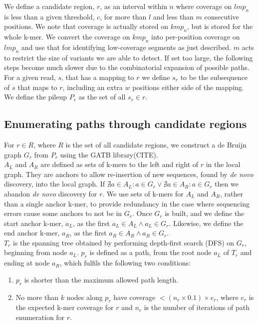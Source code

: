 We define a candidate region, $r$, as an interval within $n$ where coverage on $lmp_n$ is less than a given threshold, $c$, for more than $l$ and less than $m$ consecutive positions. We note that coverage is actually stored on $kmp_n$, but is stored for the whole k-mer. We convert the coverage on $kmp_n$ into per-position coverage on $lmp_n$ and use that for identifying low-coverage segments as just described. $m$ acts to restrict the size of variants we are able to detect. If set too large, the following steps become much slower due to the combinatorial expansion of possible paths. \\
For a given read, $s$, that has a mapping to $r$ we define $s_r$ to be the subsequence of $s$ that maps to $r$, including an extra $w$ positions either side of the mapping. We define the pileup $P_r$ as the set of all $s_r \in r$.

\subsection{Enumerating paths through candidate regions}

For $r \in R$, where $R$ is the set of all candidate regions, we construct a de Bruijn graph $G_r$ from $P_r$ using the GATB library(CITE). \\
$A_L$ and $A_R$ are defined as sets of k-mers to the left and right of $r$ in the local graph. They are anchors to allow re-insertion of new sequences, found by \textit{de novo} discovery, into the local graph. If  $\nexists a \in A_L : a \in G_r \lor \nexists a \in A_R : a \in G_r$ then we abandon \textit{de novo} discovery for $r$. We use sets of k-mers for $A_L$ and $A_R$, rather than a single anchor k-mer, to provide redundancy in the case where sequencing errors cause some anchors to not be in $G_r$. Once $G_r$ is built, and we define the start anchor k-mer, $a_L$, as the first $a_L \in A_L \land a_L \in G_r$. Likewise, we define the end anchor k-mer, $a_R$, as the first $a_R \in A_R \land a_R \in G_r$.\\

$T_r$ is the spanning tree obtained by performing depth-first search (DFS) on $G_r$, beginning from node $a_L$. $p_r$ is defined as a path, from the root node $a_L$ of $T_r$ and ending at node $a_R$, which fulfils the following two conditions:

\begin{enumerate}
  \item $p_r$ is shorter than the maximum allowed path length.
  \item No more than $k$ nodes along $p_r$ have coverage $< (n_r \times 0.1) \times e_r$, where $e_r$ is the expected k-mer coverage for $r$ and $n_r$ is the number of iterations of path enumeration for $r$.
\end{enumerate}

